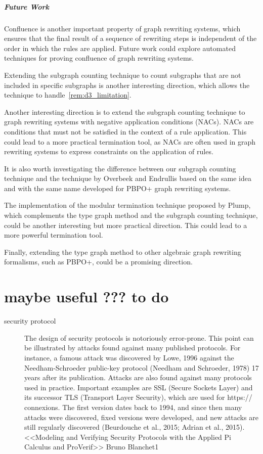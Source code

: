\documentclass{report}
\begin{document}
\paragraph{Future Work}
Confluence is another important property of graph rewriting systems, which ensures that the final result of a sequence of rewriting steps is independent of the order in which the rules are applied. Future work could explore automated techniques for proving confluence of graph rewriting systems.

Extending the subgraph counting technique to count subgraphs that are not included in specific subgraphs is another interesting direction, which allows the technique to handle~\autoref{rem:d3_limitation}.

Another interesting direction is to extend the subgraph counting technique to graph rewriting systems with negative application conditions (NACs). NACs are conditions that must not be satisfied in the context of a rule application. This could lead to a more practical termination tool, as NACs are often used in graph rewriting systems to express constraints on the application of rules.

It is also worth investigating the difference between our subgraph counting technique and
 the technique by Overbeek and Endrullis based on the same idea and with the same name developed for PBPO+ graph rewriting systems.

The implementation of the modular termination technique proposed by Plump, which complements the type graph method and the subgraph counting technique, could be another interesting but more practical direction. This could lead to a more powerful termination tool.

Finally, extending the type graph method to other algebraic graph rewriting formalisms, such as PBPO+, could be a promising direction.

\chapter{maybe useful ??? to do}
\begin{description}
    \item[security protocol] The design of security protocols is notoriously error-prone. This point can be illustrated by attacks found against many published protocols. For instance, a famous attack was discovered by Lowe, 1996 against the Needham-Schroeder public-key protocol (Needham and Schroeder, 1978) 17 years after its publication. Attacks are also found against many protocols used in practice. Important examples are SSL (Secure Sockets Layer) and its successor TLS (Transport Layer Security), which are used for https:// connexions. The first version dates back to 1994, and since then many attacks were discovered, fixed versions were developed, and new attacks are still regularly discovered (Beurdouche et al., 2015; Adrian et al., 2015).   <<Modeling and Verifying Security Protocols with the Applied Pi Calculus and ProVerif>> Bruno Blanchet1
\end{description}  

\printbibliography
\end{document}

